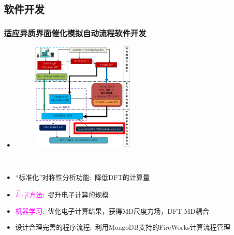 \documentclass[cjk,slidestop,compress,mathserif,blue]{beamer}
\begin{document}
\subsection{软件开发}
\frame
{
	\frametitle{适应异质界面催化模拟自动流程软件开发}
\begin{minipage}[b]{0.47\linewidth}
	\begin{itemize}
		\item \fontsize{8.0pt}{4.2pt}\selectfont{适用于异质界面的高通量材料计算自动流程软件架构}
\begin{figure}[h!]
\centering
\hskip -35pt
\includegraphics[height=2.18in]{Figures/MP_comp_BCC.png}
\label{MP_comp_BCC}
\end{figure}
	\end{itemize}
\end{minipage}
~
\begin{minipage}[b]{0.42\linewidth}
\begin{itemize}
	\item “标准化”对称性分析功能:~降低\textrm{DFT}的计算量
	\item \textcolor{magenta}{$\vec k\cdot\vec p$方法}:~提升电子计算的规模%
	\item \textcolor{magenta}{机器学习}:~优化电子计算结果，获得\textrm{MD}尺度力场，\textrm{DFT-MD}耦合%
	\item 设计合理完善的程序流程:~利用\textrm{MongoDB}支持的\textrm{FireWorks}计算流程管理%
\end{itemize}
\end{minipage}
}
\end{document}
